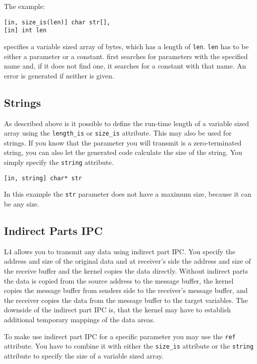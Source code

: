 The example:
\begin{verbatim}
[in, size_is(len)] char str[], 
[in] int len
\end{verbatim}

specifies a variable sized array of bytes, which has a length of \verb|len|.
\verb|len| has to be either a parameter or a constant. \dice{} first searches
for parameters with the specified name and, if it does not find one, it
searches for a constant with that name. An error is generated if neither is
given.


\subsection{Strings}

As described above is it possible to define the run-time length of a variable
sized array using the \verb|length_is| or \verb|size_is| attribute. This may
also be used for strings.  If you know that the parameter you will transmit is
a zero-terminated string, you can also let the generated code calculate the
size of the string. You simply specify the \verb|string| attribute.

\begin{verbatim}
[in, string] char* str
\end{verbatim}

In this example the \verb|str| parameter does not have a maximum size, because
it can be any size. 

\subsection{Indirect Parts IPC}

L4 allows you to transmit any data using indirect part IPC. You specify the
address and size of the original data and at receiver's side the address and
size of the receive buffer and the kernel copies the data directly. Without
indirect parts the data is copied from the source address to the message
buffer, the kernel copies the message buffer from senders side to the
receiver's message buffer, and the receiver copies the data from the message
buffer to the target variables.  The downside of the indirect part IPC is,
that the kernel may have to establish additional temporary mappings of the
data areas.

To make \dice{} use indirect part IPC for a specific parameter you may use the
\verb|ref| attribute. You have to combine it with either the \verb|size_is|
attribute or the \verb|string| attribute to specify the size of a variable
sized array.

